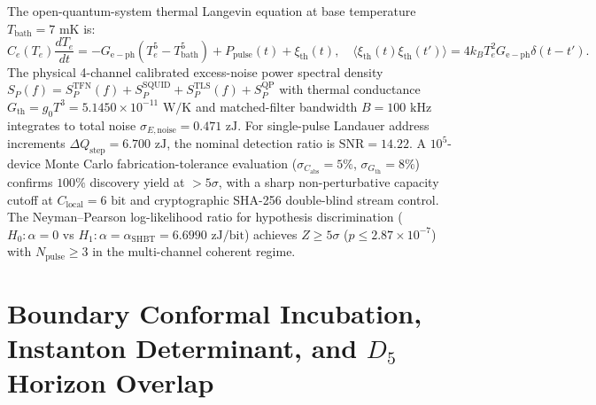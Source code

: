 \documentclass[11pt]{article}
\theoremstyle{plain}
\begin{document}
The open-quantum-system thermal Langevin equation at base temperature $T_{\mathrm{bath}} = 7\text{ mK}$ is:
\begin{equation}
C_e(T_e) \frac{dT_e}{dt} = - G_{\mathrm{e-ph}}(T_e^5 - T_{\mathrm{bath}}^5) + P_{\mathrm{pulse}}(t) + \xi_{\mathrm{th}}(t), \quad \langle \xi_{\mathrm{th}}(t) \xi_{\mathrm{th}}(t') \rangle = 4 k_B T_e^2 G_{\mathrm{e-ph}} \delta(t-t').
\end{equation}
The physical 4-channel calibrated excess-noise power spectral density $S_P(f) = S_P^{\mathrm{TFN}}(f) + S_P^{\mathrm{SQUID}} + S_P^{\mathrm{TLS}}(f) + S_P^{\mathrm{QP}}$ with thermal conductance $G_{\mathrm{th}} = g_0 T^3 = 5.1450 \times 10^{-11}\text{ W/K}$ and matched-filter bandwidth $B = 100\text{ kHz}$ integrates to total noise $\sigma_{E,\mathrm{noise}} = 0.471\text{ zJ}$. For single-pulse Landauer address increments $\Delta Q_{\mathrm{step}} = 6.700\text{ zJ}$, the nominal detection ratio is $\mathrm{SNR} = 14.22$. A $10^5$-device Monte Carlo fabrication-tolerance evaluation ($\sigma_{C_{\mathrm{abs}}} = 5\%$, $\sigma_{G_{\mathrm{th}}} = 8\%$) confirms $100\%$ discovery yield at $>5\sigma$, with a sharp non-perturbative capacity cutoff at $C_{\mathrm{local}} = 6\text{ bit}$ and cryptographic SHA-256 double-blind stream control. The Neyman--Pearson log-likelihood ratio for hypothesis discrimination ($H_0: \alpha = 0$ vs $H_1: \alpha = \alpha_{\mathrm{SHBT}} = 6.6990\text{ zJ/bit}$) achieves $Z \ge 5\sigma$ ($p \le 2.87 \times 10^{-7}$) with $N_{\mathrm{pulse}} \ge 3$ in the multi-channel coherent regime.

\section{Boundary Conformal Incubation, Instanton Determinant, and \texorpdfstring{$D_5$}{D5} Horizon Overlap}
\label{app:incubation-instanton-d5}
\end{document}
